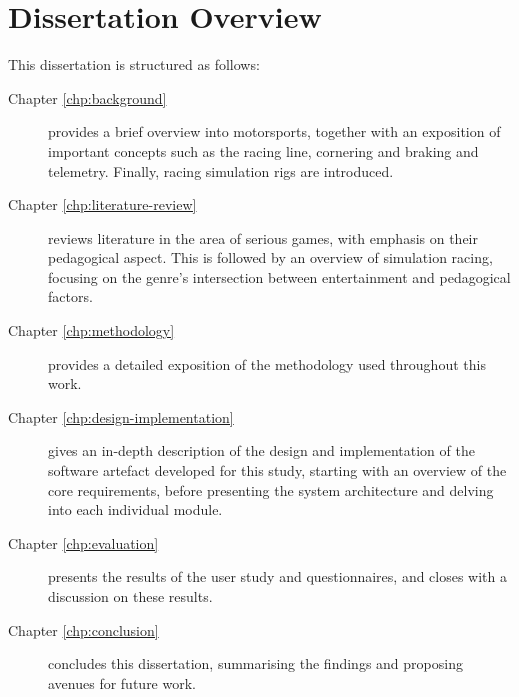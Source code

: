 \section{Dissertation Overview}
This dissertation is structured as follows:
\begin{description}
	\item [Chapter \ref{chp:background}] provides a brief overview into motorsports, together with an exposition of important concepts such as the racing line, cornering and braking and telemetry. Finally, racing simulation rigs are introduced.
	\item [Chapter \ref{chp:literature-review}] reviews literature in the area of serious games, with emphasis on their pedagogical aspect. This is followed by an overview of simulation racing, focusing on the genre's intersection between entertainment and pedagogical factors.
	\item [Chapter \ref{chp:methodology}] provides a detailed exposition of the methodology used throughout this work. 
	\item [Chapter \ref{chp:design-implementation}] gives an in-depth description of the design and implementation of the software artefact developed for this study, starting with an overview of the core requirements, before presenting the system architecture and delving into each individual module. 
	\item [Chapter \ref{chp:evaluation}] presents the results of the user study and questionnaires, and closes with a discussion on these results.
	\item [Chapter \ref{chp:conclusion}] concludes this dissertation, summarising the findings and proposing avenues for future work.
\end{description}